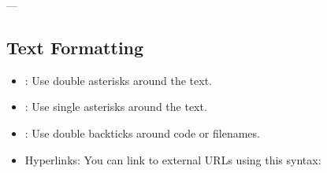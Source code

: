 \documentclass[a4paper,10pt,english]{sphinxmanual}
\begin{document}
\sphinxAtStartPar
—


\subsection{Text Formatting}
\label{\detokenize{page_two:text-formatting}}\begin{itemize}
\item {} 
\sphinxAtStartPar
{}: Use double asterisks \sphinxtitleref{**} around the text.

\begin{sphinxVerbatim}[commandchars=\\\{\}]
\end{sphinxVerbatim}

\sphinxAtStartPar
{}

\item {} 
\sphinxAtStartPar
{}: Use single asterisks \sphinxtitleref{*} around the text.

\begin{sphinxVerbatim}[commandchars=\\\{\}]
\end{sphinxVerbatim}

\sphinxAtStartPar
{}

\item {} 
\sphinxAtStartPar
{}: Use double backticks around code or filenames.

\begin{sphinxVerbatim}[commandchars=\\\{\}]
\end{sphinxVerbatim}

\sphinxAtStartPar
{}

\item {} 
\sphinxAtStartPar
Hyperlinks: You can link to external URLs using this syntax:

\begin{sphinxVerbatim}[commandchars=\\\{\}]
\end{sphinxVerbatim}

\sphinxAtStartPar
{}

\end{itemize}
\end{document}
